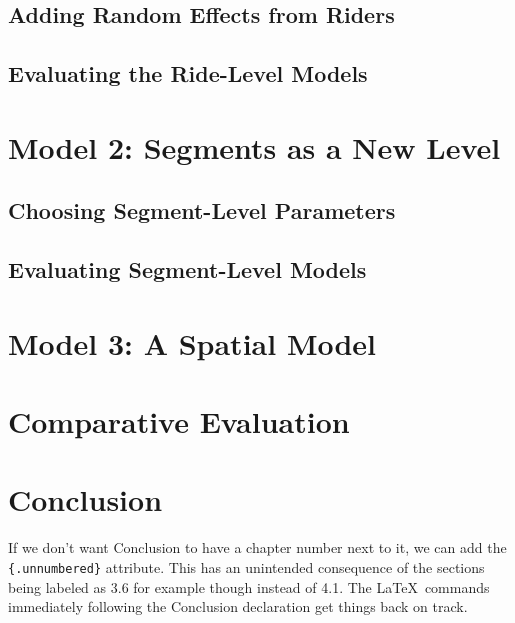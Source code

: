 \documentclass[12pt,twoside]{reedthesis}
\begin{document}
  \section{Adding Random Effects from
  Riders}\label{adding-random-effects-from-riders}
  
  \section{Evaluating the Ride-Level
  Models}\label{evaluating-the-ride-level-models}
  
  \chapter{Model 2: Segments as a New
  Level}\label{model-2-segments-as-a-new-level}
  
  \section{Choosing Segment-Level
  Parameters}\label{choosing-segment-level-parameters}
  
  \section{Evaluating Segment-Level
  Models}\label{evaluating-segment-level-models}
  
  \chapter{Model 3: A Spatial Model}\label{model-3-a-spatial-model}
  
  \chapter{Comparative Evaluation}\label{comparative-evaluation}
  
  \chapter*{Conclusion}\label{conclusion}
  
  \setcounter{chapter}{4} \setcounter{section}{0}
  
  If we don't want Conclusion to have a chapter number next to it, we can
  add the \texttt{\{.unnumbered\}} attribute. This has an unintended
  consequence of the sections being labeled as 3.6 for example though
  instead of 4.1. The \LaTeX~commands immediately following the Conclusion
  declaration get things back on track.
  
\end{document}
